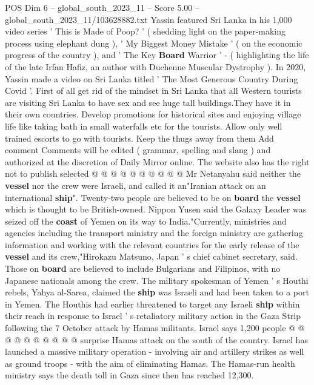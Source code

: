 \begin{textsample}{POS Dim 6 – global\_south\_2023\_11 – Score 5.00 – global\_south\_2023\_11/103628882.txt}  \label{ex:f6_pos_260}
Yassin featured Sri Lanka in his 1,000 video series ' This is Made of Poop? ' ( shedding light on the paper-making process using elephant dung ), ' My Biggest Money Mistake ' ( on the economic progress of the country ), and ' The Key \textbf{Board} Warrior ' - ( highlighting the life of the late Irfan Hafiz, an author with Duchenne Muscular Dystrophy ).
In 2020, Yassin made a video on Sri Lanka titled ' The Most Generous Country During Covid '.
First of all get rid of the mindset in Sri Lanka that all Western tourists are visiting Sri Lanka to have sex and see huge tall buildings.They have it in their own countries.
Develop promotions for historical sites and enjoying village life like taking bath in small waterfalls etc for the tourists.
Allow only well trained escorts to go with tourists.
Keep the thugs away from them Add comment Comments will be edited ( grammar, spelling and slang ) and authorized at the discretion of Daily Mirror online.
The website also has the right not to publish selected @ @ @ @ @ @ @ @ @ @ Mr Netanyahu said neither the \textbf{vessel} nor the crew were Israeli, and called it an"Iranian attack on an international \textbf{ship}".
Twenty-two people are believed to be on \textbf{board} the \textbf{vessel} which is thought to be British-owned.
Nippon Yusen said the Galaxy Leader was seized off the \textbf{coast} of Yemen on its way to India."Currently, ministries and agencies including the transport ministry and the foreign ministry are gathering information and working with the relevant countries for the early release of the \textbf{vessel} and its crew,"Hirokazu Matsuno, Japan ' s chief cabinet secretary, said.
Those on \textbf{board} are believed to include Bulgarians and Filipinos, with no Japanese nationals among the crew.
The military spokesman of Yemen ' s Houthi rebels, Yahya al-Sarea, claimed the \textbf{ship} was Israeli and had been taken to a port in Yemen.
The Houthis had earlier threatened to target any Israeli \textbf{ship} within their reach in response to Israel ' s retaliatory military action in the Gaza Strip following the 7 October attack by Hamas militants.
Israel says 1,200 people @ @ @ @ @ @ @ @ @ @ surprise Hamas attack on the south of the country.
Israel has launched a massive military operation - involving air and artillery strikes as well as ground troops - with the aim of eliminating Hamas.
The Hamas-run health ministry says the death toll in Gaza since then has reached 12,300.

\end{textsample}
